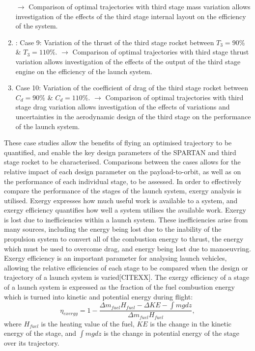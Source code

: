 \begin{enumerate}
	\newline$\rightarrow$ Comparison of optimal trajectories with third stage mass variation allows investigation of the effects of the third stage internal layout on the efficiency of the system. 
	\item: Case 9: Variation of the thrust of the third stage rocket between $T_3 = 90\%$ \& $T_3 = 110\%$. 
	\newline$\rightarrow$ Comparison of optimal trajectories with third stage thrust variation allows investigation of the effects of the output of the third stage engine on the efficiency of the launch system. 
	\item Case 10: Variation of the coefficient of drag of the third stage rocket between $C_d = 90\%$ \& $C_d = 110\%$.
	\newline$\rightarrow$ Comparison of optimal trajectories with third stage drag variation allows investigation of the effects of variations and uncertainties in the aerodynamic design of the third stage on the performance of the launch system.
\end{enumerate}
These case studies allow the benefits of flying an optimised trajectory to be quantified, and enable the key design parameters of the SPARTAN and third stage rocket to be characterised. Comparisons between the cases allows for the relative impact of each design parameter on the payload-to-orbit, as well as on the performance of each individual stage, to be assessed. 
In order to effectively compare the performance of the stages of the launch system, exergy analysis is utilised. Exergy expresses how much useful work is available to a system, and exergy efficiency quantifies how well a system utilises the available work. Exergy is lost due to inefficiencies within a launch system. These inefficiencies arise from many sources, including the energy being lost due to the inability of the propulsion system to convert all of the combustion energy to thrust, the energy which must be used to overcome drag, and energy being lost due to manoeuvring. Exergy efficiency is an important parameter for analysing launch vehicles, allowing the relative efficiencies of each stage to be compared when the design or trajectory of a launch system is varied[CITEXX]. The exergy efficiency of a stage of a launch system is expressed as the fraction of the fuel combustion energy which is turned into kinetic and potential energy during flight:
\begin{equation}
\eta_{exergy} = 1 - \frac{\Delta m_{fuel}H_{fuel} - \Delta KE - \int mg dz}{\Delta m_{fuel}H_{fuel}},
\end{equation}
where $H_{fuel}$ is the heating value of the fuel, $KE$ is the change in the kinetic energy of the stage, and $\int mg dz$ is the change in potential energy of the stage over its trajectory.

